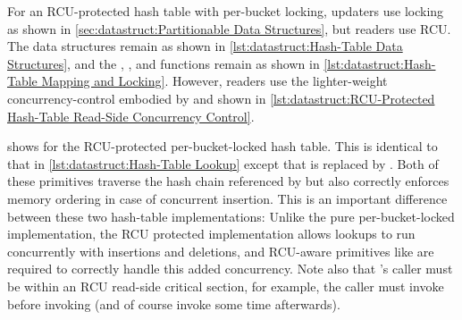 For an RCU-protected hash table with per-bucket locking,
updaters use locking as shown in
\cref{sec:datastruct:Partitionable Data Structures},
but readers use RCU\@.
The data structures remain as shown in
\cref{lst:datastruct:Hash-Table Data Structures},
and the , , and 
functions remain as shown in
\cref{lst:datastruct:Hash-Table Mapping and Locking}.
However, readers use the lighter-weight concurrency-control embodied
by  and 
shown in
\cref{lst:datastruct:RCU-Protected Hash-Table Read-Side Concurrency Control}.

\begin{listing}

\caption{RCU-Protected Hash-Table Read-Side Concurrency Control}
\label{lst:datastruct:RCU-Protected Hash-Table Read-Side Concurrency Control}
\end{listing}

shows  for the RCU-protected per-bucket-locked
hash table.
This is identical to that in
\cref{lst:datastruct:Hash-Table Lookup}
except that  is replaced
by .
Both of these primitives traverse the hash chain referenced
by  but  also
correctly enforces memory ordering in case of concurrent insertion.
This is an important difference between these two hash-table implementations:
Unlike the pure per-bucket-locked implementation, the RCU protected
implementation allows lookups to run concurrently with insertions
and deletions, and RCU-aware primitives like
 are required to correctly handle
this added concurrency.
Note also that 's caller must be within an
RCU read-side critical section, for example, the caller must invoke
 before invoking 
(and of course invoke  some time afterwards).

\begin{listing}

\caption{RCU-Protected Hash-Table Lookup}
\label{lst:datastruct:RCU-Protected Hash-Table Lookup}
\end{listing}

\QuickQuizEnd

